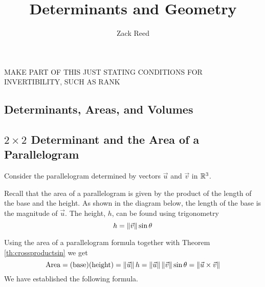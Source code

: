\documentclass{ximera}
\author{Zack Reed}
\title{Determinants and Geometry}
\begin{document}
\begin{abstract}

\end{abstract}
\maketitle

MAKE PART OF THIS JUST STATING CONDITIONS FOR INVERTIBILITY, SUCH AS RANK

\begin{onlineOnly}
    \section*{Determinants, Areas, and Volumes}
    \end{onlineOnly}
     
    \subsection*{$2\times 2$ Determinant and the Area of a Parallelogram}
     
    Consider the parallelogram determined by vectors $\vec{u}$ and $\vec{v}$ in $\mathbb{R}^3$.
     
    \begin{center}
    \end{center}
     
    Recall that the area of a parallelogram is given by the product of the length of the base and the height.
    As shown in the diagram below, the length of the base is the magnitude of $\vec{u}$. The height, $h$, can be found using trigonometry $$h=\left\|\vec{v}\right\|\sin\theta$$
    \begin{center}
    \end{center}
    Using the area of a parallelogram formula together with Theorem \ref{th:crossproductsin} we get
    $$\mbox{Area}=(\text{base})(\text{height})=\left\|\vec{u}\right\|h=\left\|\vec{u}\right\|\left\|\vec{v}\right\|\sin\theta=\left\|\vec{u}\times\vec{v}\right\|$$
    We have established the following formula.
     
\end{document}
